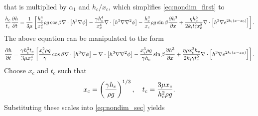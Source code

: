 that is multiplied by $\alpha_1$ and $h_c / x_c$, which simplifies \cref{eq:nondim_first} to 
\begin{gather*}
    \nonumber \frac{h_c}{t_c} \frac{\partial h}{\partial t} = \frac{1}{3\mu} \left[ 
        \frac{h_c^4}{x_c^2} \rho g \cos \beta \nabla \cdot \left[ h^3\nabla\phi \right] - 
        \frac{\gamma h_c^4}{x_c^4} \nabla \cdot \left[ h^3 \nabla \nabla^2 \phi \right] - 
        \frac{h_c^3}{x_c} \rho g \sin\beta \frac{\partial h^3}{\partial x} + 
        \frac{\eta h_c^5}{2k_i t_c^2 x_c^2} \nabla \cdot \left[ h^3 \nabla e^{2k_i \left( x-x_0 \right)} \right]
     \right]. 
\end{gather*}
The above equation can be manipulated to the form 
\begin{align}
    \frac{\partial h}{\partial t} = \frac{\gamma h_c^3 t_c}{3\mu x_c^4} \left[ 
        \frac{x_c^2 \rho g}{\gamma} \cos \beta \nabla \cdot \left[ h^3\nabla\phi \right] - 
        \nabla \cdot \left[ h^3 \nabla \nabla^2 \phi \right] - 
        \frac{x_c^3 \rho g}{\gamma h_c} \sin\beta \frac{\partial h^3}{\partial x} + 
        \frac{\eta \rho x_c^2 h_c}{2k_i \gamma t_c^2} \nabla \cdot \left[ h^3 \nabla e^{2k_i \left( x-x_0 \right)} \right]
     \right].
    \label{eq:nondim_sec}
\end{align}
Choose $x_c$ and $t_c$ such that 
\begin{align}
    x_c = \left( \frac{\gamma h_c}{\rho g} \right)^{1/3}, \quad t_c = \frac{3\mu x_c}{h_c^2 \rho g}.
    \label{eq:x_and_t_scales}
\end{align}
Substituting these scales into \cref{eq:nondim_sec} yields
